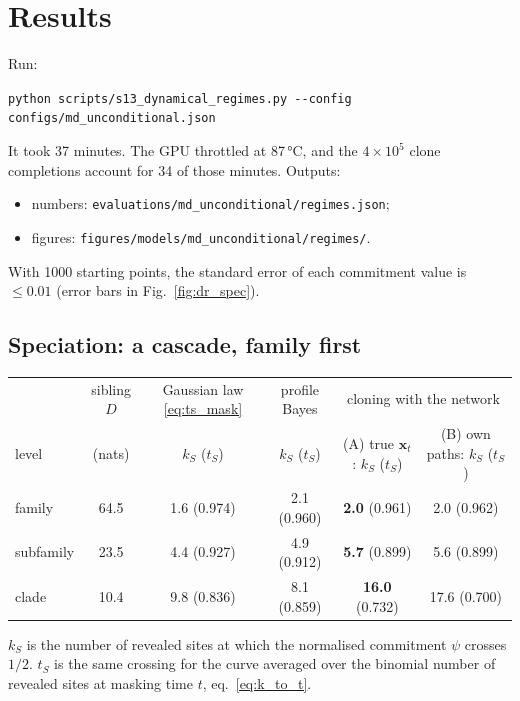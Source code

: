 \section{Results}\label{sec:dr_results}
Run:
\begin{center}\small\texttt{python scripts/s13\_dynamical\_regimes.py -{}-config configs/md\_unconditional.json}\end{center}
It took 37 minutes. The GPU throttled at 87\,°C, and the $4\times10^5$ clone completions account for 34 of those minutes. Outputs:
\begin{itemize}[nosep]
\item numbers: \texttt{evaluations/md\_unconditional/regimes.json};
\item figures: \texttt{figures/models/md\_unconditional/regimes/}.
\end{itemize}
With 1000 starting points, the standard error of each commitment value is $\le0.01$ (error bars in
Fig.~\ref{fig:dr_spec}).

\subsection{Speciation: a cascade, family first}
\begin{center}\footnotesize
\begin{tabular}{lccccc}
\toprule
 & sibling $D$ & Gaussian law \eqref{eq:ts_mask} & profile Bayes & \multicolumn{2}{c}{cloning with the network}\\
level & (nats) & $k_S$ ($t_S$) & $k_S$ ($t_S$) & (A) true $\bm x_t$: $k_S$ ($t_S$) & (B) own paths: $k_S$ ($t_S$)\\
\midrule
family & 64.5 & 1.6 (0.974) & 2.1 (0.960) & \textbf{2.0} (0.961) & 2.0 (0.962)\\
subfamily & 23.5 & 4.4 (0.927) & 4.9 (0.912) & \textbf{5.7} (0.899) & 5.6 (0.899)\\
clade & 10.4 & 9.8 (0.836) & 8.1 (0.859) & \textbf{16.0} (0.732) & 17.6 (0.700)\\
\bottomrule
\end{tabular}
\end{center}
$k_S$ is the number of revealed sites at which the normalised commitment $\psi$ crosses $1/2$. $t_S$ is the same
crossing for the curve averaged over the binomial number of revealed sites at masking time $t$, eq.~\eqref{eq:k_to_t}.

